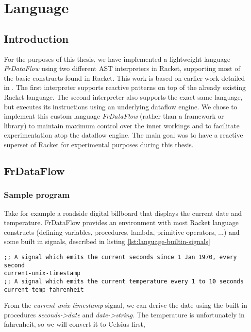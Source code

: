 \chapter{Language}
\lstset{language=lisp,showtabs=false}

\section{Introduction}

For the purposes of this thesis, we have implemented a lightweight language \textit{FrDataFlow} using two different AST interpreters in Racket, supporting most of the basic constructs found in Racket. This work is based on earlier work detailed in \citet{abelson_structure_1999}. The first interpreter supports reactive patterns on top of the already existing Racket language. The second interpreter also supports the exact same language, but executes its instructions using an underlying dataflow engine. We chose to implement this custom language \textit{FrDataFlow} (rather than a framework or library) to maintain maximum control over the inner workings and to facilitate experimentation atop the dataflow engine. The main goal was to have a reactive superset of Racket for experimental purposes during this thesis.

\newpage
\section{FrDataFlow}

\subsection{Sample program}

Take for example a roadside digital billboard that displays the current date and temperature. FrDataFlow provides an environment with most Racket language constructs (defining variables, procedures, lambda, primitive operators, ...) and some built in signals, described in listing \ref{lst:language-builtin-signals}

\begin{lstlisting}[caption={Built in signals},captionpos=b,label={lst:language-builtin-signals}]
;; A signal which emits the current seconds since 1 Jan 1970, every second
current-unix-timestamp	
;; A signal which emits the current temperature every 1 to 10 seconds
current-temp-fahrenheit 
\end{lstlisting}

From the \textit{current-unix-timestamp} signal, we can derive the date using the built in procedures \textit{seconds->date} and \textit{date->string}. The temperature is unfortunately in fahrenheit, so we will convert it to Celsius first, 


